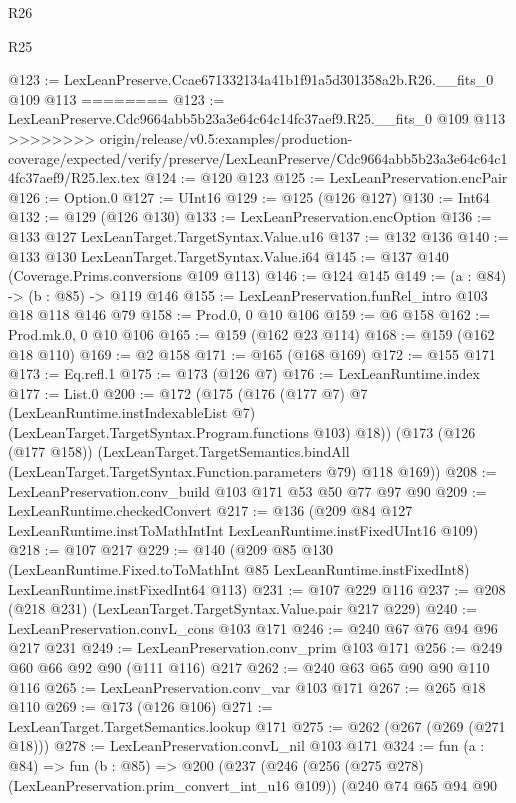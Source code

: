 \begin{lexlean}{R26}
\begin{lexlean}{R25}
\begin{coremodule}
{{{{{@123 := LexLeanPreserve.Ccae671332134a41b1f91a5d301358a2b.R26.__fits_0 @109 @113
========
@123 := LexLeanPreserve.Cdc9664abb5b23a3e64c64c14fc37aef9.R25.__fits_0 @109 @113
>>>>>>>> origin/release/v0.5:examples/production-coverage/expected/verify/preserve/LexLeanPreserve/Cdc9664abb5b23a3e64c64c14fc37aef9/R25.lex.tex
@124 := @120 @123
@125 := LexLeanPreservation.encPair
@126 := Option.{0}
@127 := UInt16
@129 := @125 (@126 @127)
@130 := Int64
@132 := @129 (@126 @130)
@133 := LexLeanPreservation.encOption
@136 := @133 @127 LexLeanTarget.TargetSyntax.Value.u16
@137 := @132 @136
@140 := @133 @130 LexLeanTarget.TargetSyntax.Value.i64
@145 := @137 @140 (Coverage.Prims.conversions @109 @113)
@146 := @124 @145
@149 := (a : @84) -> (b : @85) -> @119 @146
@155 := LexLeanPreservation.funRel_intro @103 @18 @118 @146 @79
@158 := Prod.{0, 0} @10 @106
@159 := @6 @158
@162 := Prod.mk.{0, 0} @10 @106
@165 := @159 (@162 @23 @114)
@168 := @159 (@162 @18 @110)
@169 := @2 @158
@171 := @165 (@168 @169)
@172 := @155 @171
@173 := Eq.refl.{1}
@175 := @173 (@126 @7)
@176 := LexLeanRuntime.index
@177 := List.{0}
@200 := @172
    (@175
      (@176
        (@177 @7)
        @7
        (LexLeanRuntime.instIndexableList @7)
        (LexLeanTarget.TargetSyntax.Program.functions @103)
        @18))
    (@173
      (@126 (@177 @158))
      (LexLeanTarget.TargetSemantics.bindAll
        (LexLeanTarget.TargetSyntax.Function.parameters @79)
        @118
        @169))
@208 := LexLeanPreservation.conv_build @103 @171 @53 @50 @77 @97 @90
@209 := LexLeanRuntime.checkedConvert
@217 := @136 (@209 @84 @127 LexLeanRuntime.instToMathIntInt LexLeanRuntime.instFixedUInt16 @109)
@218 := @107 @217
@229 := @140
    (@209
      @85
      @130
      (LexLeanRuntime.Fixed.toToMathInt @85 LexLeanRuntime.instFixedInt8)
      LexLeanRuntime.instFixedInt64
      @113)
@231 := @107 @229 @116
@237 := @208 (@218 @231) (LexLeanTarget.TargetSyntax.Value.pair @217 @229)
@240 := LexLeanPreservation.convL_cons @103 @171
@246 := @240 @67 @76 @94 @96 @217 @231
@249 := LexLeanPreservation.conv_prim @103 @171
@256 := @249 @60 @66 @92 @90 (@111 @116) @217
@262 := @240 @63 @65 @90 @90 @110 @116
@265 := LexLeanPreservation.conv_var @103 @171
@267 := @265 @18 @110
@269 := @173 (@126 @106)
@271 := LexLeanTarget.TargetSemantics.lookup @171
@275 := @262 (@267 (@269 (@271 @18)))
@278 := LexLeanPreservation.convL_nil @103 @171
@324 := fun (a : @84) =>
  fun (b : @85) =>
  @200
    (@237
      (@246
        (@256 (@275 @278) (LexLeanPreservation.prim_convert_int_u16 @109))
        (@240
          @74
          @65
          @94
          @90
}}}}}
\end{coremodule}
\end{lexlean}
\end{lexlean}
